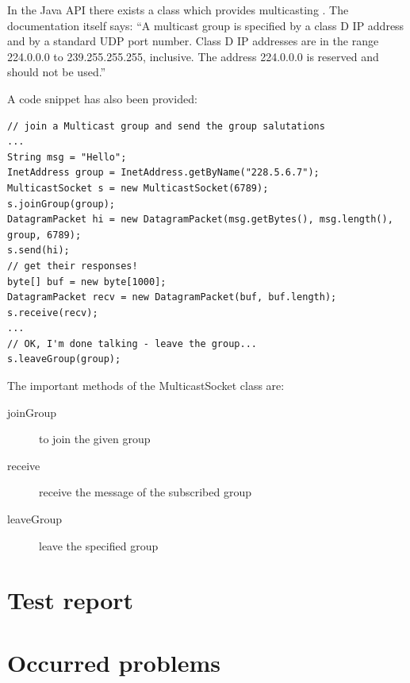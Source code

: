 \documentclass[11pt, a4paper]{article}
\begin{document}
In the Java API there exists a class which provides multicasting \cite{javamulticast}. The documentation itself says:
“A multicast group is specified by a class D IP address and by a standard UDP port number. Class D IP addresses are in the range 224.0.0.0 to 239.255.255.255, inclusive. The address 224.0.0.0 is reserved and should not be used.”

A code snippet has also been provided:

\begin{lstlisting}
// join a Multicast group and send the group salutations
...
String msg = "Hello";
InetAddress group = InetAddress.getByName("228.5.6.7");
MulticastSocket s = new MulticastSocket(6789);
s.joinGroup(group);
DatagramPacket hi = new DatagramPacket(msg.getBytes(), msg.length(),
group, 6789);
s.send(hi);
// get their responses!
byte[] buf = new byte[1000];
DatagramPacket recv = new DatagramPacket(buf, buf.length);
s.receive(recv);
...
// OK, I'm done talking - leave the group...
s.leaveGroup(group);
\end{lstlisting}

The important methods of the MulticastSocket class are:
\begin{description}
\item[joinGroup] to join the given group
\item[receive] receive the message of the subscribed group
\item[leaveGroup] leave the specified group
\end{description}

\section{Test report}
\section{Occurred problems}

\nocite{*}

{}
\end{document}
